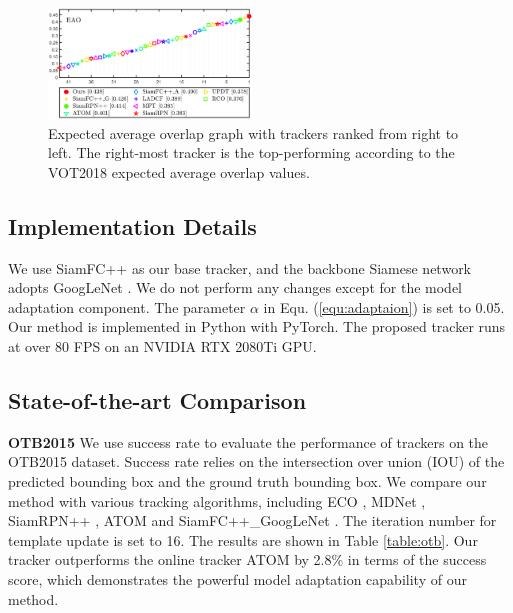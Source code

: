 \documentclass[journal]{IEEEtran}
\begin{document}
\begin{figure}[t]
    \centering
    \includegraphics[width=0.48\textwidth]{images/vot18/vot18_eao.png}
    \vspace{-0.3cm}
    \caption{Expected average overlap graph with trackers ranked from right to left. The right-most tracker is the top-performing according to the VOT2018 expected average overlap values.}
    \vspace{-0.3cm}
    \label{fig:eao}
\end{figure}

\subsection{Implementation Details}
We use SiamFC++ \cite{SiamFC++} as our base tracker, and the backbone Siamese network adopts GoogLeNet \cite{szegedy2015going}. We do not perform any changes except for the model adaptation component. The parameter $\alpha$ in Equ. (\ref{equ:adaptaion}) is set to 0.05. Our method is implemented in Python with PyTorch. The proposed tracker runs at over 80 FPS on an NVIDIA RTX 2080Ti GPU.

\subsection{State-of-the-art Comparison}
\textbf{OTB2015} We use success rate to evaluate the performance of trackers on the OTB2015 dataset. Success rate relies on the intersection over union (IOU) of the predicted bounding box and the ground truth bounding box. We compare our method with various tracking algorithms, including ECO \cite{danelljan2017eco}, MDNet \cite{nam2016learning}, SiamRPN++ \cite{li2019siamrpn++}, ATOM \cite{danelljan2019atom} and SiamFC++\_GoogLeNet \cite{SiamFC++}. The iteration number for template update is set to 16. The results are shown in Table \ref{table:otb}. Our tracker outperforms the online tracker ATOM by 2.8\% in terms of the success score, which demonstrates the powerful model adaptation capability of our method.
\end{document}
